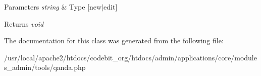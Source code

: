 \begin{DoxyParams}{Parameters}
{\em string} & Type \mbox{[}new$|$edit\mbox{]} \\
\hline
\end{DoxyParams}
\begin{DoxyReturn}{Returns}
{\itshape void} 
\end{DoxyReturn}


The documentation for this class was generated from the following file\-:\begin{DoxyCompactItemize}
\item 
/usr/local/apache2/htdocs/codebit\-\_\-org/htdocs/admin/applications/core/modules\-\_\-admin/tools/qanda.\-php\end{DoxyCompactItemize}
